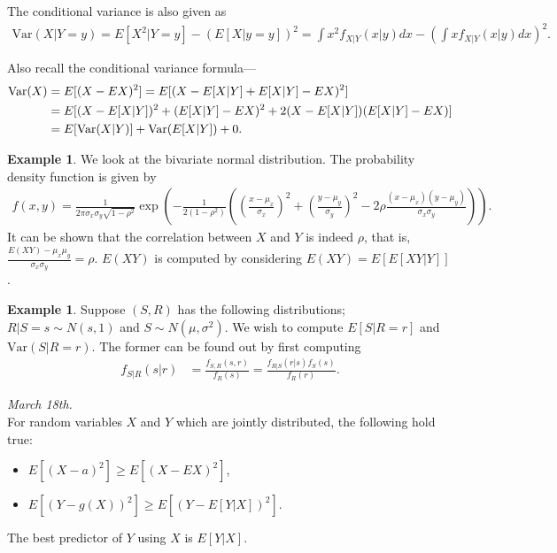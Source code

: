 \documentclass[15pt,a4paper]{book}
\theoremstyle{definition}
\newtheorem{example}[theorem]{Example}
\newcommand{\Var}{\text{Var}}
\begin{document}
The conditional variance is also given as
\begin{align}
    \Var(X|Y=y) = E[X^{2}|Y=y] - (E[X|y=y])^{2} = \int x^{2} f_{X|Y}(x|y) dx - \left( \int x f_{X|Y}(x|y) dx \right)^{2}.
\end{align}

Also recall the conditional variance formula---
\begin{align}
    \Var(X) &= E[(X-EX)^{2}] = E[(X-E[X|Y]+E[X|Y]-EX)^{2}] \notag \\
    &= E[(X-E[X|Y])^{2} + (E[X|Y]-EX)^{2} + 2(X-E[X|Y])(E[X|Y]-EX)] \notag \\
    &= E[\text{Var}(X|Y)] + \text{Var}(E[X|Y]) + 0.
\end{align}

\begin{example}
    We look at the bivariate normal distribution. The probability density function is given by
    \begin{align}
        f(x,y) = \frac{1}{2\pi \sigma_{x}\sigma_{y} \sqrt{1-\rho^{2}}} \exp \left( -\frac{1}{2(1-\rho^{2})} \left( \left( \frac{x-\mu_{x}}{\sigma_{x}} \right)^{2} + \left( \frac{y-\mu_{y}}{\sigma_{y}} \right)^{2} -2\rho \frac{(x-\mu_{x})(y-\mu_{y})}{\sigma_{x} \sigma_{y}} \right) \right).
    \end{align}
    It can be shown that the correlation between $X$ and $Y$ is indeed $\rho$, that is, $\frac{E(XY)-\mu_{x}\mu_{y}}{\sigma_{x}\sigma_{y}} = \rho$. $E(XY)$ is computed by considering $E(XY) = E[E[XY|Y]]$.
\end{example}

\begin{example}
    Suppose $(S,R)$ has the following distributions; $R|S=s \sim N(s,1)$ and $S \sim N(\mu,\sigma^{2})$. We wish to compute $E[S|R=r]$ and $\Var(S|R=r)$. The former can be found out by first computing
    \begin{align}
        f_{S|R}(s|r) &= \frac{f_{S,R}(s,r)}{f_{R}(s)} = \frac{f_{R|S}(r|s) f_{S}(s)}{f_{R}(r)}.
    \end{align}
\end{example}

\textit{March 18th.}\\
For random variables $X$ and $Y$ which are jointly distributed, the following hold true:
\begin{itemize}
    \item $E[(X-a)^{2}] \geq E[(X-EX)^{2}]$,
    \item $E[(Y-g(X))^{2}] \geq E[(Y-E[Y|X])^{2}]$.
\end{itemize}
The best predictor of $Y$ using $X$ is $E[Y|X]$.
\end{document}
